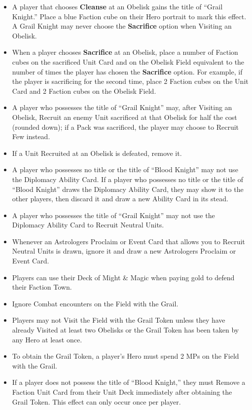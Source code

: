\begin{multicols*}{2}
\begin{itemize}
  \item A player that chooses \textbf{Cleanse} at an Obelisk gains the title of ``\textcolor{cobalt}{Grail Knight}.'' Place a blue Faction cube on their Hero portrait to mark this effect. A \textcolor{cobalt}{Grail Knight} may never choose the \textbf{Sacrifice} option when Visiting an Obelisk.
  \item When a player chooses \textbf{Sacrifice} at an Obelisk, place a number of Faction cubes on the sacrificed Unit Card and on the Obelisk Field equivalent to the number of times the player has chosen the \textbf{Sacrifice} option. For example, if the player is sacrificing for the second time, place 2 Faction cubes on the Unit Card and 2 Faction cubes on the Obelisk Field.
  \item A player who possesses the title of ``\textcolor{cobalt}{Grail Knight}'' may, after Visiting an Obelisk, Recruit an enemy Unit sacrificed at that Obelisk for half the cost (rounded down); if a Pack was sacrificed, the player may choose to Recruit Few instead.
  \item If a Unit Recruited at an Obelisk is defeated, remove it.
  \item A player who possesses no title or the title of ``\textcolor{darkcandyapplered}{Blood Knight}'' may not use the Diplomacy Ability Card. If a player who possesses no title or the title of ``\textcolor{darkcandyapplered}{Blood Knight}'' draws the Diplomacy Ability Card, they may show it to the other players, then discard it and draw a new Ability Card in its stead.
  \item A player who possesses the title of ``\textcolor{cobalt}{Grail Knight}'' may not use the Diplomacy Ability Card to Recruit Neutral  Units.
  \item Whenever an Astrologers Proclaim or Event Card that allows you to Recruit Neutral Units is drawn, ignore it and draw a new Astrologers Proclaim or Event Card.
  \item Players can use their Deck of Might \& Magic when paying gold to defend their Faction Town.
  \item Ignore Combat encounters on the Field with the Grail.
  \item Players may not Visit the Field with the Grail Token unless they have already Visited at least two Obelisks or the Grail Token has been taken by any Hero at least once.
  \item To obtain the Grail Token, a player’s Hero must spend 2 MPs on the Field with the Grail.
  \item If a player does not possess the title of ``\textcolor{darkcandyapplered}{Blood Knight},'' they must Remove a Faction Unit Card from their Unit Deck immediately after obtaining the Grail Token. This effect can only occur once per player.

\end{itemize}
\end{multicols*}
